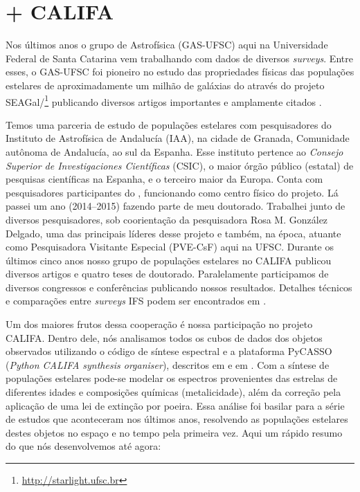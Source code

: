 \section{\STARLIGHT + CALIFA}
\label{sec:intro:SLCAL}

Nos últimos anos o grupo de Astrofísica (GAS-UFSC) aqui na Universidade Federal de Santa Catarina vem trabalhando com dados de diversos {\em surveys}. Entre esses, o GAS-UFSC foi pioneiro no estudo das propriedades físicas das populações estelares de aproximadamente um milhão de galáxias do \SDSS através do projeto SEAGal/\starlight\footnote{\href{http://starlight.ufsc.br}{http://starlight.ufsc.br}} publicando diversos artigos importantes e amplamente citados \citep[e.g., ][]{CidFernandes.etal.2005a, Mateus.etal.2006a, Stasinska.etal.2006a, Asari.etal.2007a, Stasinska.etal.2008a, CidFernandes.etal.2011a}.

Temos uma parceria de estudo de populações estelares com pesquisadores do Instituto de Astrofísica de Andalucía (IAA), na cidade de Granada, Comunidade autônoma de Andalucía, ao sul da Espanha. Esse instituto pertence ao {\em Consejo Superior de Investigaciones Científicas} (CSIC), o maior órgão público (estatal) de pesquisas científicas na Espanha, e o terceiro maior da Europa. Conta com pesquisadores participantes do \CALS, funcionando como centro físico do projeto. Lá passei um ano (2014--2015) fazendo parte de meu doutorado. Trabalhei junto de diversos pesquisadores, sob coorientação da pesquisadora Rosa M. González Delgado, uma das principais líderes desse projeto e também, na época, atuante como Pesquisadora Visitante Especial (PVE-CsF) aqui na UFSC. Durante os últimos cinco anos nosso grupo de populações estelares no CALIFA publicou diversos artigos e quatro teses de doutorado. Paralelamente participamos de diversos congressos e conferências publicando nossos resultados. Detalhes técnicos e comparações entre {\em surveys} IFS podem ser encontrados em \citet{Andre2015}.

Um dos maiores frutos dessa cooperação é nossa participação no projeto CALIFA. Dentro dele, nós analisamos todos os cubos de dados dos objetos observados utilizando o código de síntese espectral \starlight e a plataforma PyCASSO ({\em Python CALIFA \starlight synthesis organiser}), descritos em \citet{CidFernandes.etal.2013a, CidFernandes.etal.2014a} e em \citet{deAmorim.etal.2017}. Com a síntese de populações estelares pode-se modelar os espectros provenientes das estrelas de diferentes idades e composições químicas (metalicidade), além da correção pela aplicação de uma lei de extinção por poeira. Essa análise foi basilar para a série de estudos que aconteceram nos últimos anos, resolvendo as populações estelares destes objetos no espaço e no tempo pela primeira vez. Aqui um rápido resumo do que nós desenvolvemos até agora:

